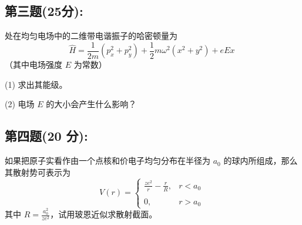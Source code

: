 \subsection{第三题(25分):}
处在均匀电场中的二维带电谐振子的哈密顿量为
\[\hat{H} = \frac{1}{2m} (p_x^2 + p_y^2) + \frac{1}{2} m\omega^2 (x^2 + y^2) + eEx~\]
（其中电场强度 $E$ 为常数）

(1) 求出其能级。

(2) 电场 $E$ 的大小会产生什么影响？
\subsection{第四题(20 分):}
如果把原子实看作由一个点核和价电子均匀分布在半径为 $a_0$ 的球内所组成，那么其散射势可表示为
\[V(r) =\begin{cases} \frac{ze^2}{r} - \frac{r}{R}, & r < a_0 \\\\0, & r > a_0 \end{cases}~\]
其中 $R = \frac{a_0^2}{ze^2}$，试用玻恩近似求散射截面。